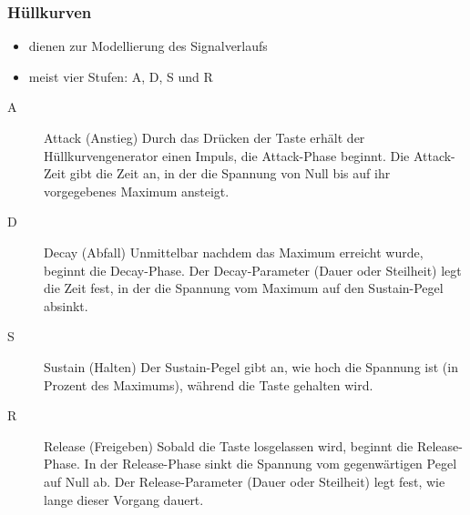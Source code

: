 \documentclass[11pt,ngerman]{beamer}
\begin{document}
\begin{frame}
\frametitle{Hüllkurven}

\begin{itemize}
\item dienen zur Modellierung des Signalverlaufs
\item meist vier Stufen: A, D, S und R
\end{itemize}
 {\scriptsize
\begin{description}
\item[A] Attack (Anstieg) Durch das Drücken der Taste erhält der Hüllkurvengenerator einen Impuls, die Attack-Phase beginnt. Die Attack-Zeit gibt die Zeit an, in der die Spannung von Null bis auf ihr vorgegebenes Maximum ansteigt. 

\item[D] Decay (Abfall)  Unmittelbar nachdem das Maximum erreicht wurde, beginnt die Decay-Phase. Der Decay-Parameter (Dauer oder Steilheit) legt die Zeit fest, in der die Spannung vom Maximum auf den Sustain-Pegel absinkt.

\item[S] Sustain (Halten)  Der Sustain-Pegel gibt an, wie hoch die Spannung ist (in Prozent des Maximums), während die Taste gehalten wird. 

\item[R] Release (Freigeben) Sobald die Taste losgelassen wird, beginnt die Release-Phase. In der Release-Phase sinkt die Spannung vom gegenwärtigen Pegel auf Null ab. Der Release-Parameter (Dauer oder Steilheit) legt fest, wie lange dieser Vorgang dauert. 

\end{description}
}

\end{frame}
\end{document}
